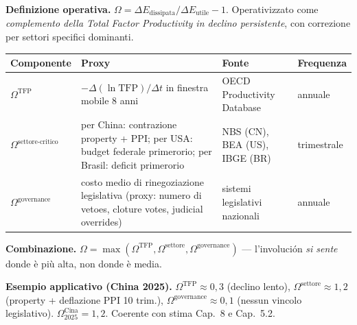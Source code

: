 \Hypoth{} \textbf{Definizione operativa.}
\(\Omega = \Delta E_{\text{dissipata}}/\Delta E_{\text{utile}} - 1\).
Operativizzato come \emph{complemento della Total Factor Productivity in
declino persistente}, con correzione per settori specifici dominanti.

{\def\LTcaptype{none} %
{\small\begin{longtable}[]{@{}
  >{\raggedright\arraybackslash}p{}
  >{\raggedright\arraybackslash}p{}
  >{\raggedright\arraybackslash}p{}
  >{\raggedright\arraybackslash}p{}@{}}
\toprule\noalign{}
\begin{minipage}[b]{\linewidth}\raggedright
Componente
\end{minipage} & \begin{minipage}[b]{\linewidth}\raggedright
Proxy
\end{minipage} & \begin{minipage}[b]{\linewidth}\raggedright
Fonte
\end{minipage} & \begin{minipage}[b]{\linewidth}\raggedright
Frequenza
\end{minipage} \\
\midrule\noalign{}
\endhead
\bottomrule\noalign{}
\endlastfoot
\(\Omega^{\text{TFP}}\) & \(-\Delta(\ln \text{TFP})/\Delta t\) in
finestra mobile 8 anni & OECD Productivity Database & annuale \\
\(\Omega^{\text{settore-critico}}\) & per China: contrazione property +
PPI; per USA: budget federale primerorio; per Brasil: deficit primerorio &
NBS (CN), BEA (US), IBGE (BR) & trimestrale \\
\(\Omega^{\text{governance}}\) & costo medio di rinegoziazione
legislativa (proxy: numero di vetoes, cloture votes, judicial overrides)
& sistemi legislativi nazionali & annuale \\
\end{longtable}}
}

\Proved{} \textbf{Combinazione.}
\(\Omega = \max(\Omega^{\text{TFP}}, \Omega^{\text{settore}}, \Omega^{\text{governance}})\)
--- l'involución \emph{si sente} donde è più alta, non donde è media.

\Hypoth{} \textbf{Esempio applicativo (China 2025).}
\(\Omega^{\text{TFP}} \approx 0{,}3\) (declino lento),
\(\Omega^{\text{settore}} \approx 1{,}2\) (property + deflazione PPI 10
trim.), \(\Omega^{\text{governance}} \approx 0{,}1\) (nessun vincolo
legislativo). \(\Omega^{\text{Cina}}_{2025} = 1{,}2\). Coerente con
stima Cap.~8 e Cap.~5.2.




